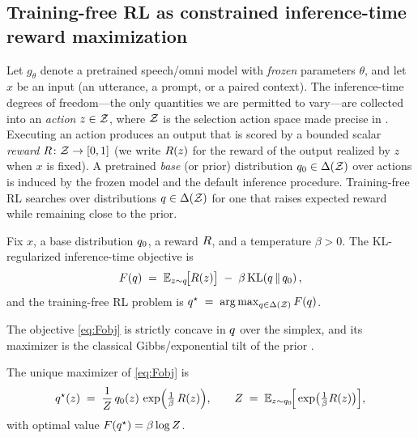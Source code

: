 \subsection{Training-free RL as constrained inference-time reward maximization}
\label{subsec:tfrl}

Let $g_\theta$ denote a pretrained speech/omni model with \emph{frozen} parameters $\theta$, and let $x$ be an input (an utterance, a prompt, or a paired context). The inference-time degrees of freedom---the only quantities we are permitted to vary---are collected into an \emph{action} $z \in \mathcal{Z}$, where $\mathcal{Z}$ is the selection action space made precise in . Executing an action produces an output that is scored by a bounded scalar \emph{reward} $R\colon \mathcal{Z} \to [0,1]$ (we write $R(z)$ for the reward of the output realized by $z$ when $x$ is fixed). A pretrained \emph{base} (or prior) distribution $q_{0} \in \Delta(\mathcal{Z})$ over actions is induced by the frozen model and the default inference procedure. Training-free RL searches over distributions $q \in \Delta(\mathcal{Z})$ for one that raises expected reward while remaining close to the prior.

\begin{definition}
\label{def:objective}
Fix $x$, a base distribution $q_{0}$, a reward $R$, and a temperature $\beta > 0$. The KL-regularized inference-time objective is
\begin{equation}
\label{eq:Fobj}
F\!\left(q\right) \;=\; \mathbb{E}_{z \sim q}\!\big[R(z)\big] \;-\; \beta\,\mathrm{KL}\!\left(q \,\|\, q_{0}\right),
\end{equation}
and the training-free RL problem is $q^{\star} \;=\; \arg\max_{q \in \Delta(\mathcal{Z})} F\!\left(q\right)$.
\end{definition}

The objective \eqref{eq:Fobj} is strictly concave in $q$ over the simplex, and its maximizer is the classical Gibbs/exponential tilt of the prior \citep{korbak2022kl}.

\begin{proposition}
\label{prop:gibbs}
The unique maximizer of \eqref{eq:Fobj} is
\begin{equation}
\label{eq:gibbs}
q^{\star}(z) \;=\; \frac{1}{Z}\,q_{0}(z)\,\exp\!\Big(\tfrac{1}{\beta}\,R(z)\Big),
\qquad
Z \;=\; \mathbb{E}_{z \sim q_{0}}\!\Big[\exp\!\big(\tfrac{1}{\beta}R(z)\big)\Big],
\end{equation}
with optimal value $F\!\left(q^{\star}\right) = \beta \log Z$.
\end{proposition}

